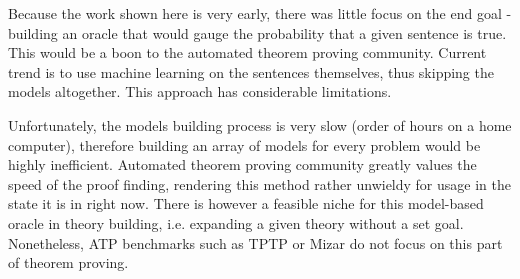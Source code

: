 Because the work shown here is very early, there was little focus on the end goal - building an oracle that would gauge the probability that a given sentence is true. This would be a boon to the automated theorem proving community. Current trend is to use machine learning on the sentences themselves, thus skipping the models altogether. This approach has considerable limitations.

Unfortunately, the models building process is very slow (order of hours on a home computer), therefore building an array of models for every problem would be highly inefficient. Automated theorem proving community greatly values the speed of the proof finding, rendering this method rather unwieldy for usage in the state it is in right now. There is however a feasible niche for this model-based oracle in theory building, i.e. expanding a given theory without a set goal. Nonetheless, ATP benchmarks such as TPTP or Mizar do not focus on this part of theorem proving.